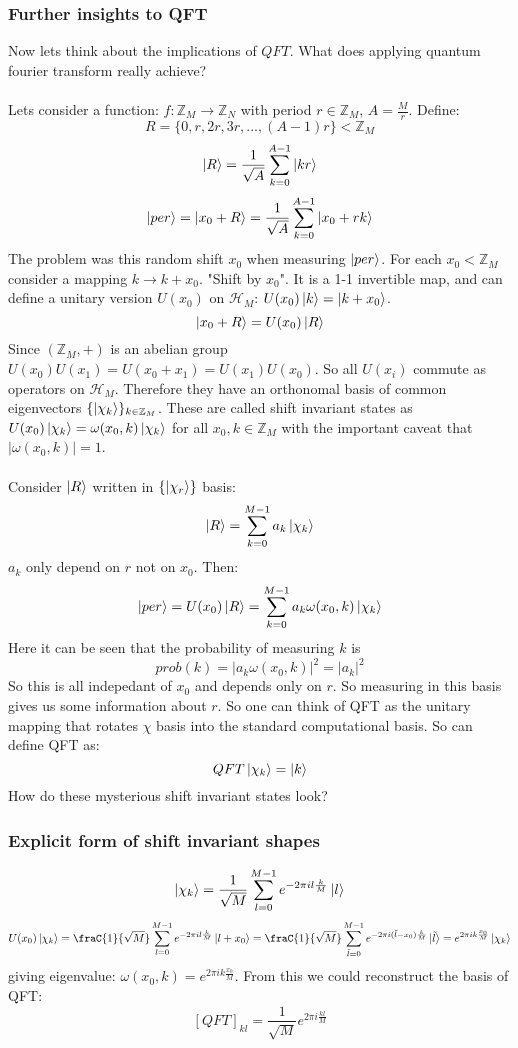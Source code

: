\documentclass{article}
\begin{document}
\subsubsection{Further insights to QFT}
Now lets think about the implications of $QFT$. What does applying quantum fourier transform really achieve?\\\\
Lets consider a function: $f: \mathbb{Z}_M \rightarrow \mathbb{Z}_N$ with period $r \in \mathbb{Z}_M$, $A= \frac{M}{r}$. Define:
$$
R = \{ 0, r, 2r, 3r,..., (A-1)r\} < \mathbb{Z}_M
$$
$$
\ket{R} = \frac{1}{\sqrt{A}} \sum_{k=0}^{A-1} \ket{kr}
$$
$$
\ket{per} = \ket{x_0 + R} = \frac{1}{\sqrt{A}} \sum_{k=0}^{A-1} \ket{x_0 + rk}
$$
The problem was this random shift $x_0$ when measuring $\ket{per}$. For each $x_0 < \mathbb{Z}_M$ consider a mapping $k \rightarrow k+ x_0$. "Shift by $x_0$". It is a 1-1 invertible map, and can define a unitary version $U(x_0)$ on $\mathcal{H}_M$: $U(x_0) \ket{k} = \ket{k+x_0}$.
$$
\ket{x_0 + R} = U(x_0) \ket{R}
$$
Since $(\mathbb{Z}_M, +)$ is an abelian group $U(x_0)U(x_1) = U(x_0+x_1) = U(x_1)U(x_0)$. So all $U(x_i)$ commute as operators on $\mathcal{H}_M$. Therefore they have an orthonomal basis of common eigenvectors $\{ \ket{\chi_k}\}_{k \in \mathbb{Z}_M}$. These are called shift invariant states as $U(x_0) \ket{\chi_k} = \omega( x_0, k) \ket{\chi_k}$ for all $x_0, k \in \mathbb{Z}_M$ with the important caveat that $|\omega( x_0, k)| = 1$.\\\\
Consider $\ket{R}$ written in $\{ \ket{\chi_r}\}$ basis:
$$
\ket{R} = \sum_{k=0}^{M-1} a_k \ket{\chi_k}
$$
$a_k$ only depend on $r$ not on $x_0$. Then:
$$
\ket{per} = U(x_0) \ket{R} = \sum_{k=0}^{M-1} a_k \omega(x_0, k) \ket{\chi_k}
$$
Here it can be seen that the probability of measuring $k$ is 
$$
prob(k) = |a_k \omega(x_0, k)|^2= |a_k|^2
$$
So this is all indepedant of $x_0$ and depends only on $r$. So measuring in this basis gives us some information about $r$. So one can think of QFT as the unitary mapping that rotates $\chi$ basis into the standard computational basis. So can define QFT as:
$$
QFT \ket{\chi_k} = \ket{k}
$$
How do these mysterious shift invariant states look?
\subsubsection{Explicit form of shift invariant shapes}
$$
\ket{\chi_k} = \frac{1}{\sqrt{M}} \sum_{l=0}^{M-1} e^{-2\pi il \frac{k}{M}} \ket{l}
$$
$$
U(x_0) \ket{\chi_k} = \fraC{1}{\sqrt{M}} \sum_{l=0}^{M-1} e^{-2\pi i l \frac{k}{M}} \ket{l + x_0} =  \fraC{1}{\sqrt{M}} \sum_{\tilde l=0}^{M-1} e^{-2\pi i (\tilde l - x_0) \frac{k}{M}} \ket{\tilde l}  = e^{2\pi i k \frac{x_0}{M}} \ket{\chi_k}
$$
giving eigenvalue: $\omega(x_0, k) = e^{2\pi i k \frac{x_0}{M}}$. From this we could reconstruct the basis of QFT:
$$
[QFT]_{kl} = \frac{1}{\sqrt{M}} e^{2\pi i \frac{kl}{M}}
$$
\end{document}

